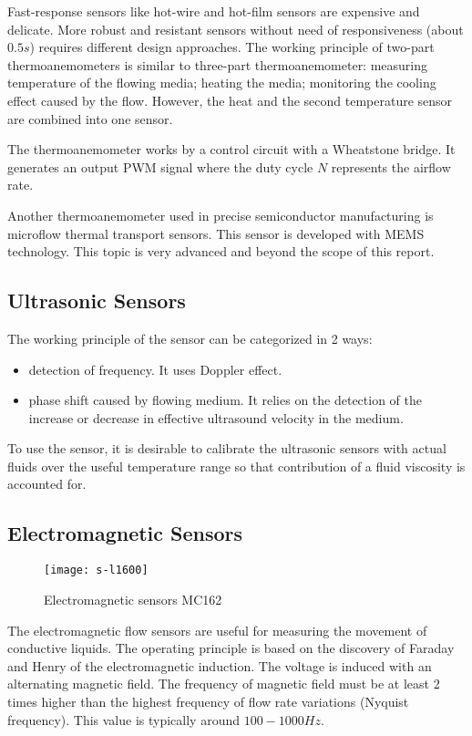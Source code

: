 Fast-response sensors like hot-wire and hot-film sensors are expensive and delicate. More robust and resistant sensors without need of responsiveness (about $ 0.5\unit{s} $) requires different design approaches. The working principle of two-part thermoanemometers is similar to three-part thermoanemometer: measuring temperature of the flowing media; heating the media; monitoring the cooling effect caused by the flow. However, the heat and the second temperature sensor are combined into one sensor.

The thermoanemometer works by a control circuit with a Wheatstone bridge. It generates an output PWM signal where the duty cycle $ N $ represents the airflow rate.

Another thermoanemometer used in precise semiconductor manufacturing is microflow thermal transport sensors. This sensor is developed with MEMS technology. This topic is very advanced and beyond the scope of this report.

\subsection{Ultrasonic Sensors}
The working principle of the sensor can be categorized in 2 ways:
\begin{itemize}
	\item detection of frequency. It uses Doppler effect.
	\item phase shift caused by flowing medium. It relies on the detection of the increase or decrease in effective ultrasound velocity in the medium. 
\end{itemize}
To use the sensor, it is desirable to calibrate the ultrasonic sensors with actual fluids over the useful temperature range so that contribution of a fluid viscosity is accounted for.

\subsection{Electromagnetic Sensors}
\begin{figure}[ht]
	\centering
	\texttt{[image: s-l1600]}
	\caption{Electromagnetic sensors MC162}
	\label{electro}
\end{figure}
The electromagnetic flow sensors are useful for measuring the movement of conductive liquids. The operating principle is based on the discovery of Faraday and Henry of the electromagnetic induction. The voltage is induced with an alternating magnetic field. The frequency of magnetic field must be at least 2 times higher than the highest frequency of flow rate variations (Nyquist frequency). This value is typically around $ 100-1000\unit{Hz} $.

